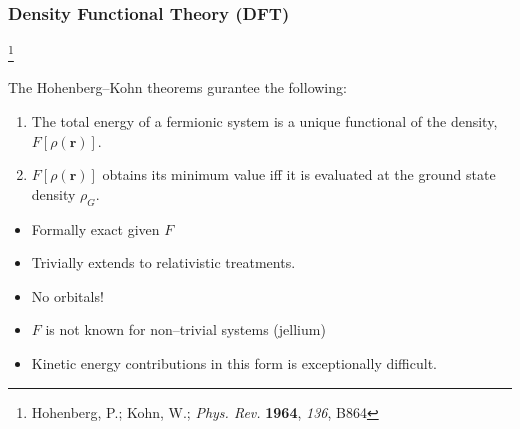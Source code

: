 \documentclass{beamer}
\newcommand\blfootnote[1]{%
  \begingroup
  \renewcommand\thefootnote{}\footnote{#1}%
  \addtocounter{footnote}{-1}%
  \endgroup
}
\begin{document}
\begin{frame}
\frametitle{Density Functional Theory (DFT)}
\blfootnote{Hohenberg, P.; Kohn, W.; \emph{Phys. Rev.} \textbf{1964}, \emph{136}, B864}

The Hohenberg--Kohn theorems gurantee the following:
\begin{enumerate}
  \item The total energy of a fermionic system is a unique functional of the density, $F[\rho(\mathbf{r})]$.
  \item $F[\rho(\mathbf{r})]$ obtains its minimum value iff it is evaluated at the ground state density $\rho_G$.
\end{enumerate}

\begin{itemize}
  \color{green}
  \item Formally exact given $F$
  \item Trivially extends to relativistic treatments.
  \item No orbitals!
\end{itemize}

\begin{itemize}
  \color{red}
  \item $F$ is not known for non--trivial systems (jellium)
  \item Kinetic energy contributions in this form is exceptionally difficult.
\end{itemize}

\end{frame}
\end{document}

